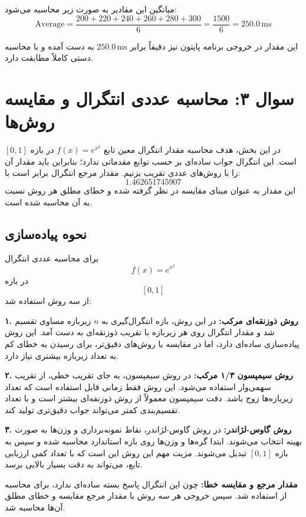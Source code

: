 \documentclass[12pt,a4paper]{article}
\begin{document}
	میانگین این مقادیر به صورت زیر محاسبه می‌شود:
	\begin{equation*}
		\text{Average}
		=
		\frac{200 + 220 + 240 + 260 + 280 + 300}{6}
		=
		\frac{1500}{6}
		=
		250.0\,\text{ms}
	\end{equation*}
	
	این مقدار در خروجی برنامه پایتون نیز دقیقاً برابر
	$250.0\,\text{ms}$
	به دست آمده و با محاسبه دستی کاملاً مطابقت دارد.
	
	
	\newpage
	\section*{سوال ۳: محاسبه عددی انتگرال و مقایسه روش‌ها}
	
	در این بخش، هدف محاسبه مقدار انتگرال معین تابع
	$f(x)=e^{x^2}$
	در بازه
	$[0,1]$
	است. این انتگرال جواب ساده‌ای بر حسب توابع مقدماتی ندارد؛ بنابراین باید مقدار آن را با روش‌های عددی تقریب بزنیم. مقدار مرجع انتگرال برابر است با:
	\[
	1.462651745907
	\]
	این مقدار به عنوان مبنای مقایسه در نظر گرفته شده و خطای مطلق هر روش نسبت به آن محاسبه شده است.
	
	\subsection*{نحوه پیاده‌سازی}
	
	برای محاسبه عددی انتگرال
	\[
	f(x)=e^{x^2}
	\]
	در بازه
	\[
	[0,1]
	\]
	از سه روش استفاده شد:
	
	\textbf{۱. روش ذوزنقه‌ای مرکب:}
	در این روش، بازه انتگرال‌گیری به
	$n$
	زیربازه مساوی تقسیم شد و مقدار انتگرال روی هر زیربازه با تقریب ذوزنقه‌ای به دست آمد. این روش پیاده‌سازی ساده‌ای دارد، اما در مقایسه با روش‌های دقیق‌تر، برای رسیدن به خطای کم به تعداد زیربازه بیشتری نیاز دارد.
	
	\textbf{۲. روش سیمپسون ۱/۳ مرکب:}
	در روش سیمپسون، به جای تقریب خطی، از تقریب سهمی‌وار استفاده می‌شود. این روش فقط زمانی قابل استفاده است که تعداد زیربازه‌ها زوج باشد. دقت سیمپسون معمولاً از روش ذوزنقه‌ای بیشتر است و با تعداد تقسیم‌بندی کمتر می‌تواند جواب دقیق‌تری تولید کند.
	
	\textbf{۳. روش گاوس-لژاندر:}
	در روش گاوس-لژاندر، نقاط نمونه‌برداری و وزن‌ها به صورت بهینه انتخاب می‌شوند. ابتدا گره‌ها و وزن‌ها روی بازه استاندارد محاسبه شده و سپس به بازه
	$[0,1]$
	تبدیل می‌شوند. مزیت مهم این روش این است که با تعداد کمی ارزیابی تابع، می‌تواند به دقت بسیار بالایی برسد.
	
	\textbf{مقدار مرجع و مقایسه خطا:}
	چون این انتگرال پاسخ بسته ساده‌ای ندارد، برای محاسبه از
	استفاده شد. سپس خروجی هر سه روش با مقدار مرجع مقایسه و خطای مطلق آن‌ها محاسبه شد.
	
\end{document}
